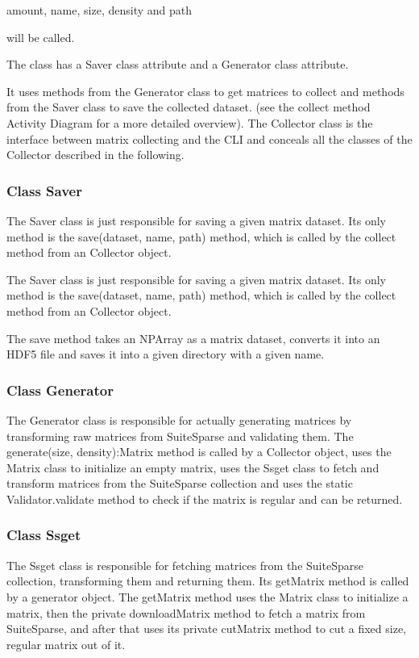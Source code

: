 \documentclass[parskip=full]{scrartcl}
\begin{document}
amount, name, size, density and path

will be called. 

The class has a Saver class attribute and a Generator class attribute.

It uses methods from the Generator class to get matrices to collect and methods from the Saver class to save the collected dataset.
(see the collect method Activity Diagram for a more detailed overview).
The Collector class is the interface between matrix collecting and the CLI and conceals all the classes of the Collector described in the following.

\subsubsection{Class Saver}

The Saver class is just responsible for saving a given matrix dataset.
Its only method is the save(dataset, name, path) method, which
is called by the collect method from an Collector object.

The Saver class is just responsible for saving a given matrix dataset. Its only method is the save(dataset, name, path) method, which
is called by the collect method from an Collector object.

The save method takes an NPArray as a matrix dataset, converts it into an HDF5 file and saves it into a given directory with a given name.

\subsubsection{Class Generator}
The Generator class is responsible for actually generating matrices by transforming raw matrices from SuiteSparse and validating them.
The generate(size, density):Matrix method is called by a Collector object, uses the Matrix class to initialize an empty matrix, uses the Ssget class to fetch and transform matrices from the SuiteSparse collection and uses the static Validator.validate method to check if the matrix is regular and can be returned.

\subsubsection{Class Ssget}
The Ssget class is responsible for fetching matrices from the SuiteSparse collection, transforming them and returning them.
Its getMatrix method is called by a generator object.
The getMatrix method uses the Matrix class to initialize a matrix, then the private downloadMatrix method to fetch a matrix from SuiteSparse, and after that uses its private cutMatrix method to cut a fixed size, regular matrix out of it.
\end{document}
